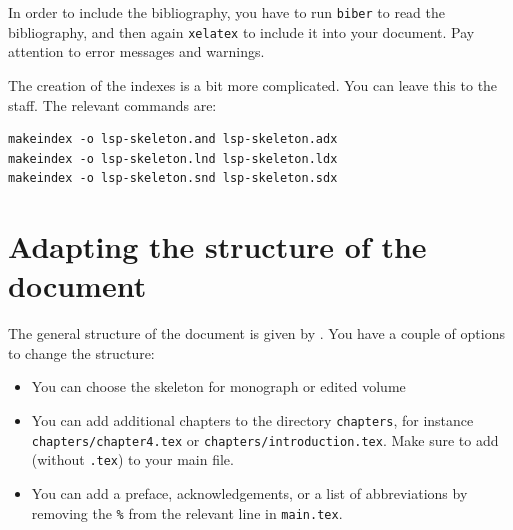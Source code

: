In order to include the bibliography, you have to run \verb+biber+ to read the bibliography, and then again \verb+xelatex+ to include it into your document. Pay attention to error messages and warnings.
 

The creation of the indexes is a bit more complicated. You can leave this to the \lsp staff. The relevant commands are:

\begin{verbatim}
makeindex -o lsp-skeleton.and lsp-skeleton.adx
makeindex -o lsp-skeleton.lnd lsp-skeleton.ldx 
makeindex -o lsp-skeleton.snd lsp-skeleton.sdx
\end{verbatim} 


\section{Adapting the structure of the document}
The general structure of the document is given by \lsp. You have a couple of options to change the structure:
\begin{itemize}
 \item You can choose the skeleton for monograph or edited volume
 \item You can add additional chapters to the directory \verb+chapters+, for instance\\ \verb+chapters/chapter4.tex+ or \verb+chapters/introduction.tex+. Make sure to add \verb++ (without \verb+.tex+) to your main file.
 \item You can add a preface, acknowledgements, or a list of abbreviations by removing the \verb+%+ from the relevant line in \verb+main.tex+.
 \end{itemize}



